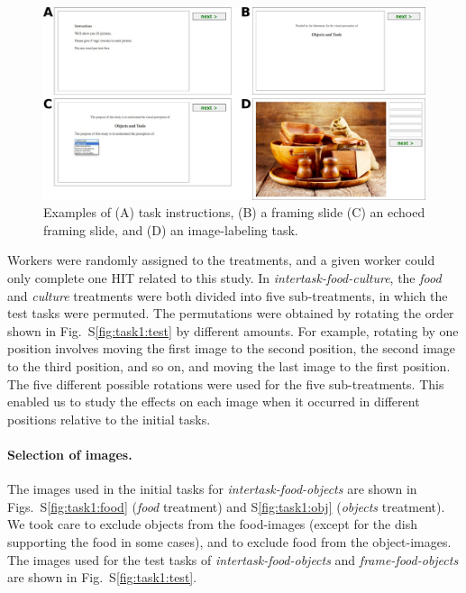 \documentclass[12pt]{article}
\begin{document}
\begin{figure}
	\includegraphics[scale=0.8]{figs/tasks.jpg}
	\caption{Examples of (A) task instructions, (B) a framing slide
		(C) an echoed framing slide, and (D) an image-labeling 
		task.
	}
	\label{fig:hit_preamble}
\end{figure}
Workers were randomly assigned to the treatments, and 
a given worker could only complete one HIT related to this study.  
In \textit{intertask-food-culture}, the \textit{food} and \textit{culture}
treatments were both divided into five sub-treatments, 
in which the test tasks were permuted.  
The permutations were obtained by rotating 
the order shown in Fig.~S\ref{fig:task1:test} by different amounts. 
For example, rotating by one position involves moving the first image to the 
second position, the second image to the third position, and so on, and 
moving the last image to the first position.  
The five different possible rotations were used for the five 
sub-treatments.  This enabled us to study the effects on each image when
it occurred in different positions relative to the initial tasks.

\paragraph{Selection of images.} 

The images used in the initial tasks for \textit{intertask-food-objects}  
are shown in Figs.~S\ref{fig:task1:food} (\textit{food} treatment) and 
S\ref{fig:task1:obj} (\textit{objects} treatment).
We took care to exclude objects from
the food-images (except for the dish supporting the food in some cases), and 
to exclude food from the object-images.  The images used for the test tasks
of \textit{intertask-food-objects} and \textit{frame-food-objects} are shown 
in Fig.~S\ref{fig:task1:test}.
\end{document}
